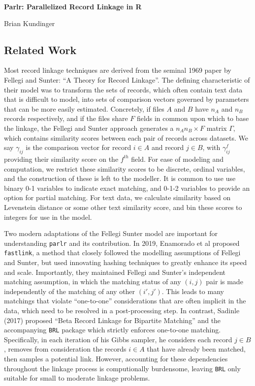\documentclass[
  12pt,
]{article}
\author{}
\date{\vspace{-2.5em}}
\begin{document}
\begin{flushright} 
    \end{flushright}
    \begin{center} \textbf{Parlr: Parallelized Record Linkage in R}
    
    Brian Kundinger

    \end{center}

\hypertarget{related-work}{%
\subsection{Related Work}\label{related-work}}

Most record linkage techniques are derived from the seminal 1969 paper
by Fellegi and Sunter: ``A Theory for Record Linkage''. The defining
characteristic of their model was to transform the sets of records,
which often contain text data that is difficult to model, into sets of
comparison vectors governed by parameters that can be more easily
estimated. Concretely, if files \(A\) and \(B\) have \(n_A\) and \(n_B\)
records respectively, and if the files share \(F\) fields in common upon
which to base the linkage, the Fellegi and Sunter approach generates a
\(n_A n_B \times F\) matrix \(\Gamma\), which contains similarity scores
between each pair of records across datasets. We say \(\gamma_{ij}\) is
the comparison vector for record \(i \in A\) and record \(j \in B\),
with \(\gamma_{ij}^f\) providing their similarity score on the
\(f^{th}\) field. For ease of modeling and computation, we restrict
these similarity scores to be discrete, ordinal variables, and the
construction of these is left to the modeller. It is common to use use
binary 0-1 variables to indicate exact matching, and 0-1-2 variables to
provide an option for partial matching. For text data, we calculate
similarity based on Levenstein distance or some other text similarity
score, and bin these scores to integers for use in the model.

Two modern adaptations of the Fellegi Sunter model are important for
understanding \texttt{parlr} and its contribution. In 2019, Enamorado et
al proposed \texttt{fastlink}, a method that closely followed the
modelling assumptions of Fellegi and Sunter, but used innovating hashing
techniques to greatly enhance its speed and scale. Importantly, they
maintained Fellegi and Sunter's independent matching assumption, in
which the matching status of any \((i,j)\) pair is made independently of
the matching of any other \((i', j')\). This leads to many matchings
that violate ``one-to-one'' considerations that are often implicit in
the data, which need to be resolved in a post-processing step. In
contrast, Sadinle (2017) proposed ``Beta Record Linkage for Bipartite
Matching'' and the accompanying \texttt{BRL} package which strictly
enforces one-to-one matching. Specifically, in each iteration of his
Gibbs sampler, he considers each record \(j\in B\), removes from
consideration the records \(i\in A\) that have already been matched,
then samples a potential link. However, accounting for these
dependencies throughout the linkage process is computionally burdensome,
leaving \texttt{BRL} only suitable for small to moderate linkage
problems.
\end{document}
